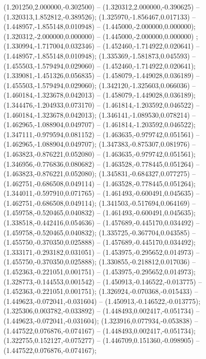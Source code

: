  (1.201250,2.000000,-0.302500) -- (1.320312,2.000000,-0.390625) -- (1.320313,1.852812,-0.389526);
 (1.325970,-1.856467,0.017133) -- (1.448957,-1.855148,0.010948) -- (1.445000,-2.000000,0.000000);
 (1.320312,-2.000000,0.000000) -- (1.445000,-2.000000,0.000000) ;
 (1.330994,-1.717004,0.032346) -- (1.452460,-1.714922,0.020641) -- (1.448957,-1.855148,0.010948);
 (1.335369,-1.581873,0.045593) -- (1.455503,-1.579494,0.029060) -- (1.452460,-1.714922,0.020641);
 (1.339081,-1.451326,0.056835) -- (1.458079,-1.449028,0.036189) -- (1.455503,-1.579494,0.029060);
 (1.342120,-1.325603,0.066036) -- (1.460184,-1.323678,0.042013) -- (1.458079,-1.449028,0.036189);
 (1.344476,-1.204933,0.073170) -- (1.461814,-1.203592,0.046522) -- (1.460184,-1.323678,0.042013);
 (1.346141,-1.089530,0.078214) -- (1.462965,-1.088904,0.049707) -- (1.461814,-1.203592,0.046522);
 (1.347111,-0.979594,0.081152) -- (1.463635,-0.979742,0.051561) -- (1.462965,-1.088904,0.049707);
 (1.347383,-0.875307,0.081976) -- (1.463823,-0.876221,0.052080) -- (1.463635,-0.979742,0.051561);
 (1.346956,-0.776836,0.080682) -- (1.463528,-0.778445,0.051264) -- (1.463823,-0.876221,0.052080);
 (1.345831,-0.684327,0.077275) -- (1.462751,-0.686508,0.049114) -- (1.463528,-0.778445,0.051264);
 (1.344011,-0.597910,0.071765) -- (1.461493,-0.600491,0.045635) -- (1.462751,-0.686508,0.049114);
 (1.341503,-0.517694,0.064169) -- (1.459758,-0.520465,0.040832) -- (1.461493,-0.600491,0.045635);
 (1.338518,-0.442416,0.054636) -- (1.457689,-0.445170,0.034492) -- (1.459758,-0.520465,0.040832);
 (1.335725,-0.367704,0.043585) -- (1.455750,-0.370350,0.025888) -- (1.457689,-0.445170,0.034492);
 (1.333171,-0.293182,0.031051) -- (1.453975,-0.295652,0.014973) -- (1.455750,-0.370350,0.025888);
 (1.330855,-0.218812,0.017036) -- (1.452363,-0.221051,0.001751) -- (1.453975,-0.295652,0.014973);
 (1.328773,-0.144553,0.001542) -- (1.450913,-0.146522,-0.013775) -- (1.452363,-0.221051,0.001751);
 (1.326924,-0.070368,-0.015433) -- (1.449623,-0.072041,-0.031604) -- (1.450913,-0.146522,-0.013775);
 (1.325306,0.003782,-0.033892) -- (1.448493,0.002417,-0.051734) -- (1.449623,-0.072041,-0.031604);
 (1.323916,0.077934,-0.053838) -- (1.447522,0.076876,-0.074167) -- (1.448493,0.002417,-0.051734);
 (1.322755,0.152127,-0.075277) -- (1.446709,0.151360,-0.098905) -- (1.447522,0.076876,-0.074167);
